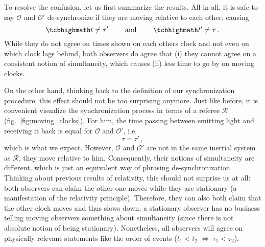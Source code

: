 To resolve the confusion, let us first summarize the results. All in all, it is safe to say $\mathcal{O}$ and $\mathcal{O}'$ de-synchronize if they are moving relative to each other, causing
\begin{equation}
	\eqbox{
	t \neq \tau'
	}
	\qquad \text{ and } \qquad
	\eqbox{
	t' \neq \tau
	} \, .
\end{equation}
While they do not agree on times shown on each others clock and not even on which clock lags behind, both observers do agree that (i) they cannot agree on a consistent notion of simultaneity, which causes (ii) less time to go by on moving clocks.


On the other hand, thinking back to the definition of our synchronization procedure, this effect should not be too surprising anymore. Just like before, it is convenient visualize the synchronization process in terms of a referee $\mathcal{R}$ (fig.~\ref{fig:moving_clocks}). For him, the time passing between emitting light and receiving it back is equal for $\mathcal{O}$ and $\mathcal{O}'$, i.e.
\begin{equation}
	\tau = \tau' \, ,
\end{equation}
which is what we expect. However, $\mathcal{O}$ and $\mathcal{O}'$ are not in the same inertial system as $\mathcal{R}$, they move relative to him. Consequently, their notions of simultaneity are different, which is just an equivalent way of phrasing de-synchronization. Thinking about previous results of relativity, this should not surprise us at all: both observers can claim the other one moves while they are stationary (a manifestation of the relativity principle). Therefore, they can also both claim that the other clock moves and thus slows down, a stationary observer has no business telling moving observers something about simultaneity (since there is not absolute notion of being stationary). Nonetheless, all observers will agree on physically relevant statements like the order of events ($t_1 < t_2 \; \Leftrightarrow \; \tau_1 < \tau_2$).



